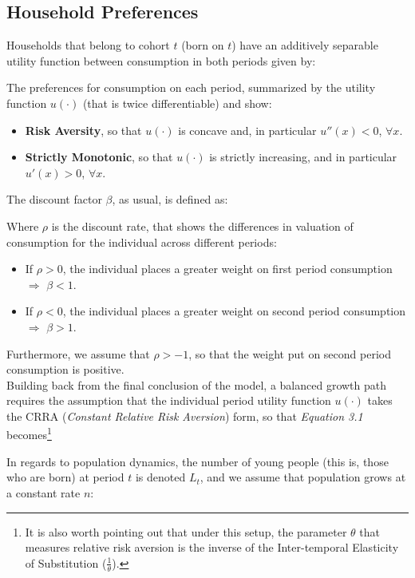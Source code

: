 \subsection{Household Preferences}

Households that belong to cohort $t$ (born on $t$) have an additively separable utility function between consumption in both periods given by:

\bigskip
The preferences for consumption on each period, summarized by the utility function $u(\cdot)$ (that is twice differentiable) and show:
\begin{itemize}
\item \textbf{Risk Aversity}, so that $u(\cdot)$ is concave and, in particular $u''(x)<0$, $\forall x$.
\item \textbf{Strictly Monotonic}, so that $u(\cdot)$ is strictly increasing, and in particular $u'(x)>0$, $\forall x$.
\end{itemize}

The discount factor $\beta$, as usual, is defined as:

\bigskip
Where $\rho$ is the discount rate, that shows the differences in valuation of consumption for the individual across different periods:
\begin{itemize}
\item If $\rho>0$, the individual places a greater weight on first period consumption $\Rightarrow$ $\beta<1$.
\item If $\rho<0$, the individual places a greater weight on second period consumption $\Rightarrow$ $\beta>1$.
\end{itemize}

Furthermore, we assume that $\rho>-1$, so that the weight put on second period consumption is positive. \\

Building back from the final conclusion of the model, a balanced growth path requires the assumption that the individual period utility function $u(\cdot)$ takes the CRRA (\textit{Constant Relative Risk Aversion}) form, so that \textit{Equation 3.1} becomes\footnote{It is also worth pointing out that under this setup, the parameter $\theta$ that measures relative risk aversion is the inverse of the Inter-temporal Elasticity of Substitution ($\frac{1}{\theta}$).}

\bigskip
In regards to population dynamics, the number of young people (this is, those who are born) at period $t$ is denoted $L_t$, and we assume that population grows at a constant rate $n$:

